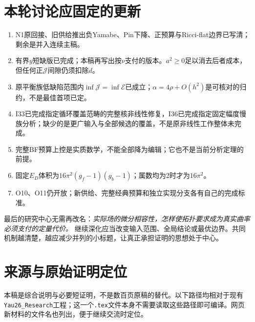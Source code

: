 \documentclass[UTF8,fontset=fandol,zihao=-4,a4paper]{ctexart}
\theoremstyle{remark}
\newcommand{\E}{\mathcal E}
\newcommand{\J}{\mathcal J}
\begin{document}
\section{本轮讨论应固定的更新}

\begin{enumerate}
\item N1原回接、旧供给推出负Yamabe、Pin下降、正预算与Ricci-flat边界已写清；剩余是并入连续主稿。
\item 有界$y$短缺版已完成；本稿再写出按$\nu$支付的版本。$a^2\ge0$足以消去后者成本，但任何正$\J$间隙仍须扣除$d$。
\item 原平衡族低缺陷范围内$\inf\J=\inf\E$已成立；$\alpha=4\rho+O(h^2)$是可核对的归约，不是最佳首项已定。
\item I33已完成指定循环覆盖范畴的完整核非线性修复，I36已完成指定固定幅度慢族分析；缺少的是更广输入与全部候选的覆盖，不是原非线性工作整体未完成。
\item 完整BF预算上控是实质数学，不能全部降为编辑；它也不是当前分析定理的前提。
\item 固定$E_D$体积为$16\pi^2(g_f-1)(g_b-1)$；属数均为2时才为$16\pi^2$。
\item O10、O11仍开放；新供给、完整经典预算和独立实现分支各有自己的完成标准。
\end{enumerate}

最后的研究中心无需再改名：\emph{实际场的微分相容性，怎样使拓扑要求成为真实曲率必须支付的定量代价。} 继续深化应当改变输入范围、全局结论或最优边界。共同机制越清楚，越应减少并列的小标题，让真正承担证明的思想处于中心。

\appendix
\section{来源与原始证明定位}

本稿是综合说明与必要短证明，不是数百页原稿的替代。以下路径均相对于现有\texttt{Yau26\_Research}工程；这一个\texttt{.tex}文件本身不需要读取这些路径即可编译。网页新材料的文件名也列出，便于继续交流时定位。
\end{document}

